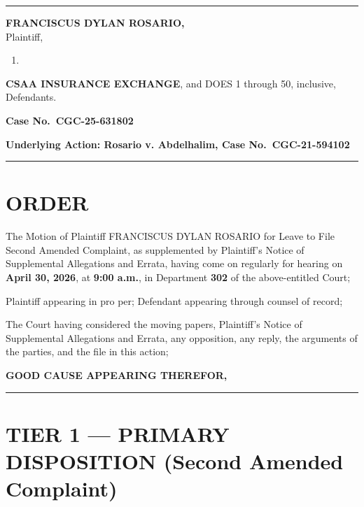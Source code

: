 \begin{center}\rule{0.5\linewidth}{0.5pt}\end{center}

\textbf{FRANCISCUS DYLAN ROSARIO,}\\
Plaintiff,

\begin{enumerate}
\def\labelenumi{\alph{enumi}.}
\setcounter{enumi}{21}
\tightlist
\item
\end{enumerate}

\textbf{CSAA INSURANCE EXCHANGE}, and DOES 1 through 50, inclusive,\\
Defendants.

\textbf{Case No.~CGC-25-631802}

\textbf{Underlying Action: Rosario v. Abdelhalim, Case No.~CGC-21-594102}

\begin{center}\rule{0.5\linewidth}{0.5pt}\end{center}

\section{ORDER}\label{order}

The Motion of Plaintiff FRANCISCUS DYLAN ROSARIO for Leave to File Second Amended Complaint, as supplemented by Plaintiff's Notice of Supplemental Allegations and Errata, having come on regularly for hearing on \textbf{April 30, 2026}, at \textbf{9:00 a.m.}, in Department \textbf{302} of the above-entitled Court;

Plaintiff appearing in pro per; Defendant appearing through counsel of record;

The Court having considered the moving papers, Plaintiff's Notice of Supplemental Allegations and Errata, any opposition, any reply, the arguments of the parties, and the file in this action;

\textbf{GOOD CAUSE APPEARING THEREFOR,}

\begin{center}\rule{0.5\linewidth}{0.5pt}\end{center}

\section{TIER 1 --- PRIMARY DISPOSITION (Second Amended Complaint)}\label{tier-1-primary-disposition-second-amended-complaint}

